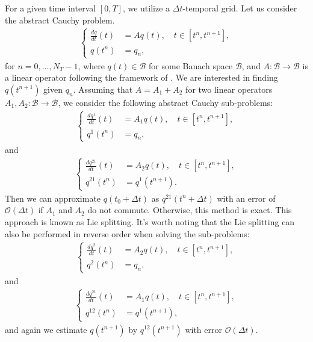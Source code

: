 For a given time interval $[0,T]$, we utilize a $\Delta t$-temporal grid. Let us consider the abstract Cauchy problem.
\begin{align*}
	\begin{cases}
		\frac{dq}{dt}(t) &= Aq(t), \quad t \in [t^n,t^{n+1}],\\
		q(t^n) &= q_n,
	\end{cases}
\end{align*}
for $n=0,\ldots, N_T-1$, where $q(t) \in \mathcal{B}$ for some Banach space $\mathcal{B}$, and $A:\mathcal{B} \to \mathcal{B}$ is a linear operator
following the framework of \citet[Chapter~3]{richtmyer:1968}.
We are interested in finding $q(t^{n+1})$ given $q_n$.
Assuming that $A = A_1 + A_2$ for two linear operators $A_1, A_2:\mathcal{B} \to \mathcal{B}$, we consider the following abstract Cauchy sub-problems:
\begin{align*}
	\begin{cases}
		\frac{dq^1}{dt}(t) &= A_1q(t), \quad t \in [t^{n},t^{n+1}],\\
		q^{1}(t^n) &= q_n,
	\end{cases}
\end{align*}
and
\begin{align*}
	\begin{cases}
		\frac{dq^{21}}{dt}(t) &= A_2q(t), \quad t \in [t^n,t^{n+1}],\\
		q^{21}(t^n) &= q^1(t^{n+1}).
	\end{cases}
\end{align*}
Then we can approximate $q(t_0 + \Delta t)$ as $q^{21}(t^n + \Delta t)$ 
with an error of $\mathcal{O}(\Delta t)$ if $A_1$ and $A_2$ do not commute. 
Otherwise, this method is exact.
This approach is known as Lie splitting. 
It's worth noting that the Lie splitting can also be performed in reverse order when solving the sub-problems:
\begin{align*}
	\begin{cases}
		\frac{dq^2}{dt}(t) &= A_2q(t), \quad t \in [t^n,t^{n+1}],\\
		q^{2}(t^n) &= q_n,
	\end{cases}
\end{align*}
and 
\begin{align*}
	\begin{cases}
		\frac{dq^{21}}{dt}(t) &= A_1q(t), \quad t \in [t^n,t^{n+1}],\\
		q^{12}(t^n) &= q^1(t^{n+1}),
	\end{cases}
\end{align*}
and again we estimate $q(t^{n+1})$ by $q^{12}(t^{n+1})$ with error $\mathcal{O}(\Delta t)$.
